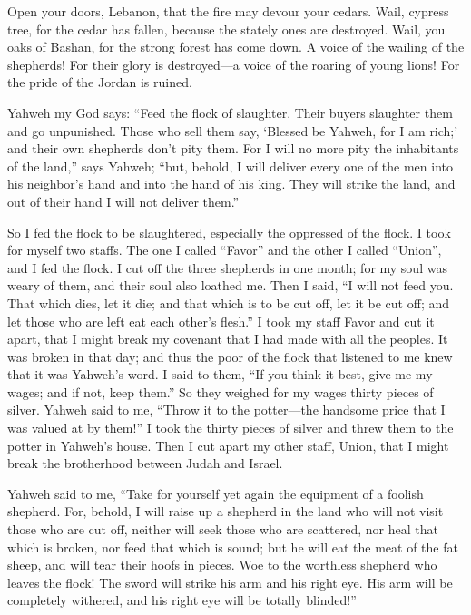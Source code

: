  Open your doors, Lebanon, that the fire may devour your
cedars.  Wail, cypress tree, for the cedar has fallen,
because the stately ones are destroyed. Wail, you oaks of Bashan, for
the strong forest has come down.  A voice of the wailing of
the shepherds! For their glory is destroyed---a voice of the roaring of
young lions! For the pride of the Jordan is ruined.

 Yahweh my God says: ``Feed the flock of slaughter.
 Their buyers slaughter them and go unpunished. Those who
sell them say, `Blessed be Yahweh, for I am rich;' and their own
shepherds don't pity them.  For I will no more pity the
inhabitants of the land,'' says Yahweh; ``but, behold, I will deliver
every one of the men into his neighbor's hand and into the hand of his
king. They will strike the land, and out of their hand I will not
deliver them.''

 So I fed the flock to be slaughtered, especially the
oppressed of the flock. I took for myself two staffs. The one I called
``Favor'' and the other I called ``Union'', and I fed the flock.
 I cut off the three shepherds in one month; for my soul was
weary of them, and their soul also loathed me.  Then I said,
``I will not feed you. That which dies, let it die; and that which is to
be cut off, let it be cut off; and let those who are left eat each
other's flesh.''  I took my staff Favor and cut it apart,
that I might break my covenant that I had made with all the peoples.
 It was broken in that day; and thus the poor of the flock
that listened to me knew that it was Yahweh's word.  I said
to them, ``If you think it best, give me my wages; and if not, keep
them.'' So they weighed for my wages thirty pieces of silver.
 Yahweh said to me, ``Throw it to the potter---the handsome
price that I was valued at by them!'' I took the thirty pieces of silver
and threw them to the potter in Yahweh's house.  Then I cut
apart my other staff, Union, that I might break the brotherhood between
Judah and Israel.

 Yahweh said to me, ``Take for yourself yet again the
equipment of a foolish shepherd.  For, behold, I will raise
up a shepherd in the land who will not visit those who are cut off,
neither will seek those who are scattered, nor heal that which is
broken, nor feed that which is sound; but he will eat the meat of the
fat sheep, and will tear their hoofs in pieces.  Woe to the
worthless shepherd who leaves the flock! The sword will strike his arm
and his right eye. His arm will be completely withered, and his right
eye will be totally blinded!''

